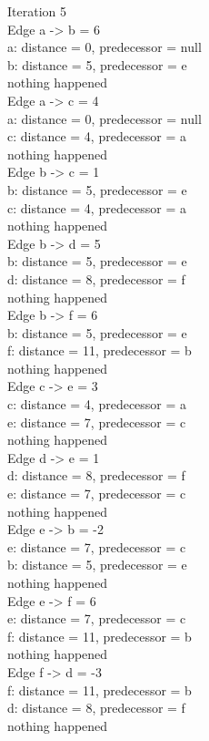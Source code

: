 \noindent Iteration 5\\
Edge a -> b = 6\\
a: distance = 0, predecessor = null\\
b: distance = 5, predecessor = e\\
nothing happened\\
Edge a -> c = 4\\
a: distance = 0, predecessor = null\\
c: distance = 4, predecessor = a\\
nothing happened\\
Edge b -> c = 1\\
b: distance = 5, predecessor = e\\
c: distance = 4, predecessor = a\\
nothing happened\\
Edge b -> d = 5\\
b: distance = 5, predecessor = e\\
d: distance = 8, predecessor = f\\
nothing happened\\
Edge b -> f = 6\\
b: distance = 5, predecessor = e\\
f: distance = 11, predecessor = b\\
nothing happened\\
Edge c -> e = 3\\
c: distance = 4, predecessor = a\\
e: distance = 7, predecessor = c\\
nothing happened\\
Edge d -> e = 1\\
d: distance = 8, predecessor = f\\
e: distance = 7, predecessor = c\\
nothing happened\\
Edge e -> b = -2\\
e: distance = 7, predecessor = c\\
b: distance = 5, predecessor = e\\
nothing happened\\
Edge e -> f = 6\\
e: distance = 7, predecessor = c\\
f: distance = 11, predecessor = b\\
nothing happened\\
Edge f -> d = -3\\
f: distance = 11, predecessor = b\\
d: distance = 8, predecessor = f\\
nothing happened\\

